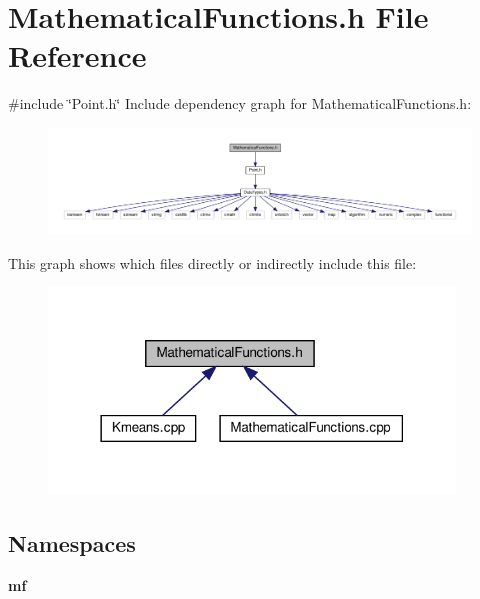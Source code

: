 \section{Mathematical\+Functions.\+h File Reference}
\label{_mathematical_functions_8h}
{\ttfamily \#include \char`\"{}Point.\+h\char`\"{}}\newline
Include dependency graph for Mathematical\+Functions.\+h\+:\nopagebreak
\begin{figure}[H]
\begin{center}
\leavevmode
\includegraphics[width=350pt]{_mathematical_functions_8h__incl}
\end{center}
\end{figure}
This graph shows which files directly or indirectly include this file\+:\nopagebreak
\begin{figure}[H]
\begin{center}
\leavevmode
\includegraphics[width=306pt]{_mathematical_functions_8h__dep__incl}
\end{center}
\end{figure}
\subsection*{Namespaces}
\begin{DoxyCompactItemize}
\item 
 \textbf{ mf}
\end{DoxyCompactItemize}
